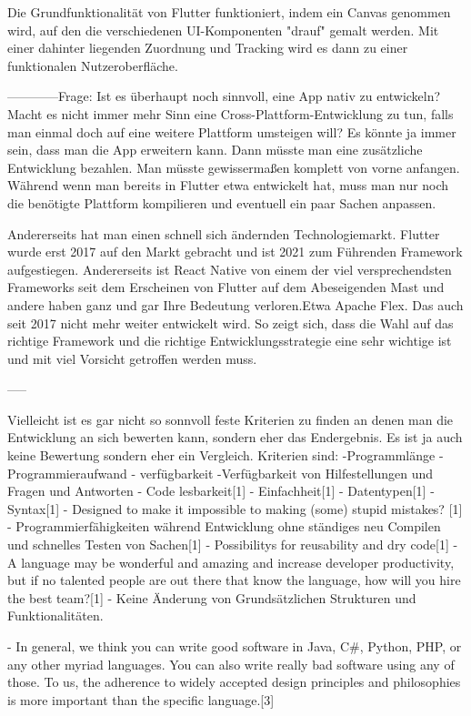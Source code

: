 Die Grundfunktionalität von Flutter funktioniert, indem ein Canvas genommen wird, auf den die verschiedenen UI-Komponenten "drauf" gemalt werden. Mit einer dahinter liegenden Zuordnung und Tracking wird es dann zu einer funktionalen Nutzeroberfläche.

------------Frage: Ist es überhaupt noch sinnvoll, eine App nativ zu entwickeln? Macht es nicht immer mehr Sinn eine Cross-Plattform-Entwicklung zu tun, falls man einmal doch auf eine weitere Plattform umsteigen will? 
Es könnte ja immer sein, dass man die App erweitern kann. Dann müsste man eine zusätzliche Entwicklung bezahlen. Man müsste gewissermaßen komplett von vorne anfangen. Während wenn man bereits in Flutter etwa entwickelt hat, muss man nur noch die benötigte Plattform kompilieren und eventuell ein paar Sachen anpassen. 

Andererseits hat man einen schnell sich ändernden Technologiemarkt. Flutter wurde erst 2017 auf den Markt gebracht und ist 2021 zum Führenden Framework aufgestiegen. Andererseits ist React Native von einem der viel versprechendsten Frameworks seit dem Erscheinen von Flutter auf dem Abeseigenden Mast und andere haben ganz und gar Ihre Bedeutung verloren.Etwa Apache Flex. Das auch seit 2017 nicht mehr weiter entwickelt wird. So zeigt sich, dass die Wahl auf das richtige Framework und die richtige Entwicklungsstrategie eine sehr wichtige ist und mit viel Vorsicht getroffen werden muss.

-----

Vielleicht ist es gar nicht so sonnvoll feste Kriterien zu finden an denen man die Entwicklung an sich bewerten kann, sondern eher das Endergebnis. Es ist ja auch keine Bewertung sondern eher ein Vergleich.
Kriterien sind:
-Programmlänge
-Programmieraufwand
- verfügbarkeit
-Verfügbarkeit von Hilfestellungen und Fragen und Antworten
- Code lesbarkeit[1]
- Einfachheit[1]
- Datentypen[1]
- Syntax[1]
- Designed to make it impossible to making (some) stupid mistakes? [1]
- Programmierfähigkeiten während Entwicklung ohne ständiges neu Compilen und schnelles Testen     von Sachen[1]
- Possibilitys for reusability and dry code[1]
- A language may be wonderful and amazing and increase developer productivity, but if no talented people are out there that know the language, how will you hire the best team?[1]
- Keine Änderung von Grundsätzlichen Strukturen und Funktionalitäten.

- In general, we think you can write good software in Java, C\#, Python, PHP, or any other myriad languages. You can also write really bad software using any of those. To us, the adherence to widely accepted design principles and philosophies is more important than the specific language.[3]



